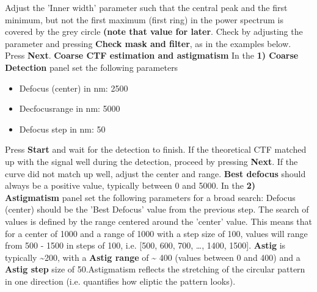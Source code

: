 \documentclass[12pt,a4paper]{scrartcl}
\begin{document}
Adjust the ’Inner width’ parameter such that the central peak and the first minimum, but not the first maximum (first ring) in the power spectrum is covered by the grey circle \textbf{(note that value for later}. Check by adjusting the parameter and pressing \textbf{Check mask and filter}, as in the examples below. Press \textbf{Next}.  
\vspace{1em}
\newline\textbf{Coarse CTF estimation and astigmatism} 
\vspace{1em}
\newline In the \textbf{1) Coarse Detection} panel set the following parameters
\begin{itemize}
\item Defocus (center) in nm: 2500
\item Decfocusrange in nm: 5000
\item Defocus step in nm: 50 
\end{itemize}
Press \textbf{Start} and wait for the detection to finish. 
\newline If the theoretical CTF matched up with the signal well during the detection, proceed by pressing \textbf{Next}. If the curve did not match up well, adjust the center and range. \textbf{Best defocus} should always be a positive value, typically between 0 and 5000.
\vspace{1em}
\newline In the \textbf{2) Astigmatism} panel set the following parameters for a broad search:
Defocus (center) should be the ’Best Defocus’ value from the previous step. The search of values is defined by the range centered around the ’center’ value. This means that for a center of 1000 and a range of 1000 with a step size of 100, values will range from 500 - 1500 in steps of 100, i.e. [500, 600, 700, \dots , 1400, 1500].
\vspace{1em}
\newline\textbf{Astig} is typically \~{}200, with a \textbf{Astig range} of \~{} 400 (values between 0 and 400) and a \textbf{Astig step} size of 50.Astigmatism reflects the stretching of the circular pattern in one direction (i.e. quantifies how eliptic the pattern looks).
\vspace{1em}
\end{document}
